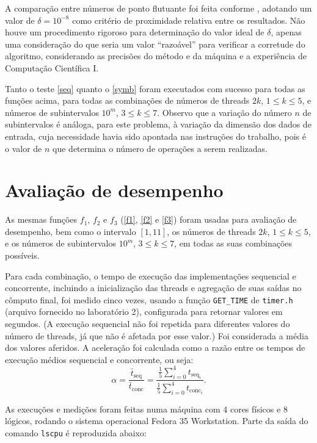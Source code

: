 \documentclass{article}
\begin{document}
  A comparação entre números de ponto flutuante foi feita conforme \cite{float}, adotando um valor de $\delta = 10^{-8}$ como critério de proximidade relativa entre os resultados. Não houve um procedimento rigoroso para determinação do valor ideal de $\delta$, apenas uma consideração do que seria um valor ``razoável'' para verificar a corretude do algoritmo, considerando as precisões do método e da máquina e a experiência de Computação Científica I. 
  
  Tanto o teste \ref{seq} quanto o \ref{symb} foram executados com sucesso para todas as funções acima, para todas as combinações de números de threads $2k$, $1 \leq k \leq 5$, e números de subintervalos $10^m$, $3 \leq k \leq 7$. Observo que a variação do número $n$ de subintervalos é análoga, para este problema, à variação da dimensão dos dados de entrada, cuja necessidade havia sido apontada nas instruções do trabalho, pois é o valor de $n$ que determina o número de operações a serem realizadas.

  \section{Avaliação de desempenho} \label{perf}

  As mesmas funções $f_1$, $f_2$ e $f_3$ (\eqref{f1}, \eqref{f2} e \eqref{f3}) foram usadas para avaliação de desempenho, bem como o intervalo $[1, 11]$, os números de threads $2k$, $1 \leq k \leq 5$, e os números de subintervalos $10^m$, $3 \leq k \leq 7$, em todas as suas combinações possíveis.

  Para cada combinação, o tempo de execução das implementações sequencial e concorrente, incluindo a inicialização das threads e agregação de suas saídas no cômputo final, foi medido cinco vezes, usando a função \texttt{GET\_TIME} de \texttt{timer.h} (arquivo fornecido no laboratório 2), configurada para retornar valores em segundos. (A execução sequencial não foi repetida para diferentes valores do número de threads, já que não é afetada por esse valor.) Foi considerada a média dos valores aferidos. A aceleração foi calculada como a razão entre os tempos de execução médios sequencial e concorrente, ou seja:
  \begin{equation} \label{acc}
    \alpha = \frac{\bar{t}_{\text{seq}}}{\bar{t}_{\text{conc}}} = \frac{\frac{1}{5} \sum_{i=0}^4 t_{\text{seq}_i}}{\frac{1}{5} \sum_{i=0}^4 t_{\text{conc}_i}}.
  \end{equation}

  As execuções e medições foram feitas numa máquina com 4 cores físicos e 8 lógicos, rodando o sistema operacional Fedora 35 Workstation. Parte da saída do comando \texttt{lscpu} é reproduzida abaixo:
\end{document}
